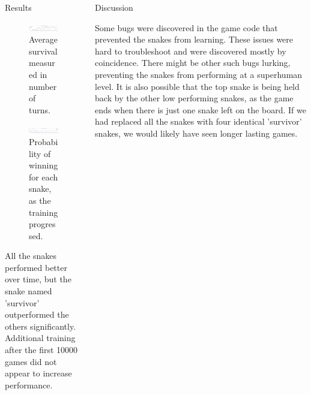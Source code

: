 \documentclass[final]{beamer}
\newlength{\onecolwid}
\newlength{\twocolwid}
\begin{document}
\begin{frame}[t]
\begin{columns}[t]
\begin{column}{\twocolwid}
\begin{columns}[t,totalwidth=\twocolwid]
\begin{column}{\onecolwid}

\begin{block}{Results}

\begin{figure}
\includegraphics[width=0.8\linewidth]{average_survival.PNG}
\caption{Average survival measured in number of turns.}
\end{figure}


\begin{figure}
\includegraphics[width=0.8\linewidth]{win_chance.PNG}
\caption{Probability of winning for each snake, as the training progressed.}
\end{figure}

All the snakes performed better over time, but the snake named 'survivor' outperformed the others significantly. 
Additional training after the first 10000 games did not appear to increase performance. 
\end{block}

\end{column} %

\begin{column}{\onecolwid} %

\begin{block}{Discussion}

Some bugs were discovered in the game code that prevented the snakes from learning. 
These issues were hard to troubleshoot and were discovered mostly by coincidence. 
There might be other such bugs lurking, preventing the snakes from performing at a superhuman level. 
It is also possible that the top snake is being held back by the other low performing snakes, as the game ends when there is just one snake left on the board. 
If we had replaced all the snakes with four identical 'survivor' snakes, we would likely have seen longer lasting games. 


\end{block}
\end{column}
\end{columns}
\end{column}
\end{columns}
\end{frame}
\end{document}
